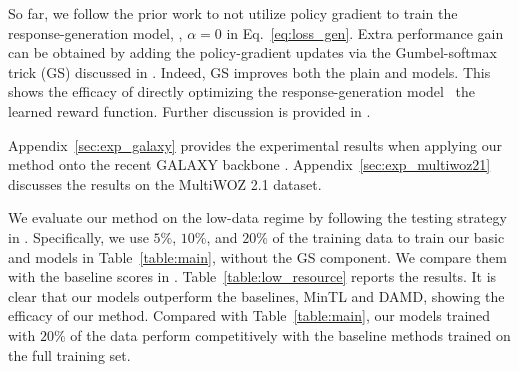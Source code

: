 So far, we follow the prior work to not utilize policy gradient to train the response-generation model, \ie, $\alpha=0$ in Eq.~\eqref{eq:loss_gen}.
Extra performance gain can be obtained by adding the policy-gradient updates via the Gumbel-softmax trick (GS) discussed in .
Indeed, GS improves both the plain \rewardnet and \rewardmle models.
This shows the efficacy of directly optimizing the response-generation model \wrt~the learned reward function.
Further discussion is provided in .

Appendix~\ref{sec:exp_galaxy} provides the experimental results when applying our method onto the recent  GALAXY backbone \citep{he2022galaxy}.
Appendix~\ref{sec:exp_multiwoz21} discusses the results on the MultiWOZ 2.1 dataset.

We evaluate our method on the low-data regime by following the testing strategy in \citet{mintl2020}.
Specifically, we use $5\%$, $10\%$, and $20\%$ of the training data to train our basic \rewardnet and \rewardmle models in Table~\ref{table:main}, without the GS component. 
We compare them with the baseline scores in \citet{mintl2020}.
Table~\ref{table:low_resource} reports the results.
It is clear that our models outperform the baselines, MinTL and DAMD, showing the efficacy of our method.
Compared with Table~\ref{table:main}, our models trained with $20\%$ of the data perform competitively with the baseline methods trained on the full training set.


